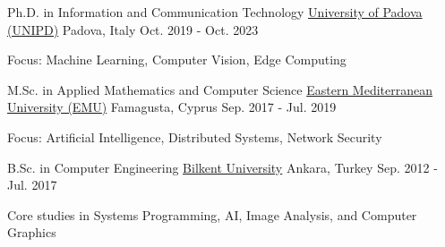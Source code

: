 
\begin{cventries}

  \cventry
    {Ph.D. in Information and Communication Technology} %
    {\href{https://www.unipd.it/}{University of Padova (UNIPD)}} %
    {Padova, Italy} %
    {Oct. 2019 - Oct. 2023} %
    {
      \begin{cvitems}
        \item {Focus: Machine Learning, Computer Vision, Edge Computing}
      \end{cvitems}
    }

  \cventry
    {M.Sc. in Applied Mathematics and Computer Science} %
    {\href{https://www.emu.edu.tr/en}{Eastern Mediterranean University (EMU)}} %
    {Famagusta, Cyprus} %
    {Sep. 2017 - Jul. 2019} %
    {
      \begin{cvitems}
        \item {Focus: Artificial Intelligence, Distributed Systems, Network Security}
      \end{cvitems}
    }

  \cventry
    {B.Sc. in Computer Engineering} %
    {\href{https://www.bilkent.edu.tr/}{Bilkent University}} %
    {Ankara, Turkey} %
    {Sep. 2012 - Jul. 2017} %
    {
      \begin{cvitems}
        \item {Core studies in Systems Programming, AI, Image Analysis, and Computer Graphics}
      \end{cvitems}
    }

\end{cventries}
